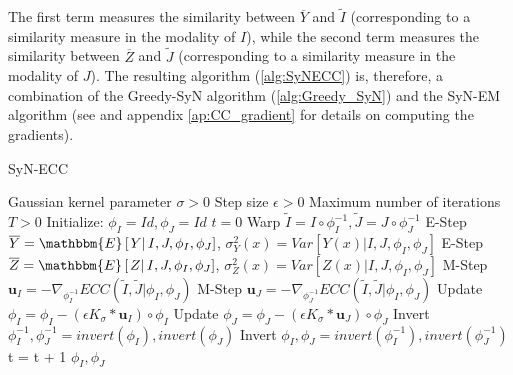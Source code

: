 The first term measures the similarity between $\overline{Y}$ and $\tilde{I}$ (corresponding to a similarity measure in the modality of $I$), while the second term measures the
similarity between $\overline{Z}$ and $\tilde{J}$ (corresponding to a similarity measure in the modality of $J$). The resulting algorithm (\ref{alg:SyNECC})
is, therefore, a combination of the Greedy-SyN algorithm (\ref{alg:Greedy_SyN}) and the SyN-EM algorithm (see \cite{Avants2008} and appendix \ref{ap:CC_gradient} for details on
computing the gradients).

\begin{algorithm}[h!]
\caption{SyN-ECC}\label{alg:SyNECC}
\begin{algorithmic}[1]
\REQUIRE Gaussian kernel parameter $\sigma>0$
\REQUIRE Step size $\epsilon>0$
\REQUIRE Maximum number of iterations $T>0$
\STATE Initialize: $\phi_{I} = Id, \phi_{J} = Id$
\STATE $t=0$
\REPEAT
    \STATE Warp $\tilde{I}  = I \circ \phi_{I}^{-1}, \tilde{J} = J \circ \phi_{J}^{-1}$
    \STATE E-Step $\overline{Y} = \mathbbm{E}\left[\left.Y\right| I, J, \phi_{I}, \phi_{J}\right]$, $\sigma^{2}_{Y}(x) = Var\left[\left.Y(x)\right| I, J, \phi_{I}, \phi_{J}\right]$
    \STATE E-Step $\overline{Z} = \mathbbm{E}\left[\left.Z\right| I, J, \phi_{I}, \phi_{J}\right]$, $\sigma^{2}_{Z}(x) = Var\left[\left.Z(x)\right| I, J, \phi_{I}, \phi_{J}\right]$
    \STATE M-Step $\mathbf{u}_{I} = - \nabla_{\phi^{-1}_{I}} ECC(\tilde{I}, \tilde{J} | \phi_{I}, \phi_{J})$
    \STATE M-Step $\mathbf{u}_{J} = - \nabla_{\phi^{-1}_{J}} ECC(\tilde{I}, \tilde{J} | \phi_{I}, \phi_{J})$
    \STATE Update $\phi_{I} = \phi_{I} - \left(\epsilon K_{\sigma} \ast \mathbf{u}_{I} \right)\circ \phi_{I}$
    \STATE Update $\phi_{J} = \phi_{J} - \left(\epsilon K_{\sigma} \ast \mathbf{u}_{J} \right)\circ \phi_{J}$
    \STATE Invert $\phi_{I}^{-1}, \phi_{J}^{-1} = invert(\phi_{I}), invert(\phi_{J})$
    \STATE Invert $\phi_{I}, \phi_{J} = invert(\phi_{I}^{-1}), invert(\phi_{J}^{-1})$
    \STATE t = t + 1
\RETURN $\phi_{I}, \phi_{J}$
\end{algorithmic}
\end{algorithm}
